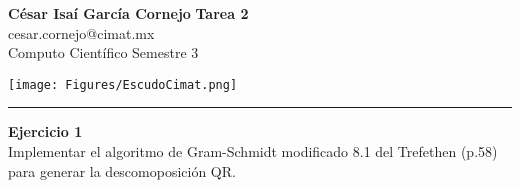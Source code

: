 \documentclass[a4paper, 11pt]{article}
\newenvironment{problem}[2][Ejercicio]
{ \begin{mdframed}[backgroundcolor= red!50] \textbf{#1 #2} \\}
	{  \end{mdframed}}
\begin{document}
	\noindent
	
	\begin{minipage}[b][1.2cm][t]{0.8\textwidth}
		\large\textbf{César Isaí García Cornejo} \hfill \textbf{Tarea 2}  \\
		cesar.cornejo@cimat.mx \hfill \\
		\normalsize Computo Científico \hfill Semestre 3\\
	\end{minipage}
	
	\hspace{14.4cm}
	\begin{minipage}[b][0.03cm][t]{0.12\linewidth}
		
		\vspace{-2.2cm}
		\texttt{[image: Figures/EscudoCimat.png]}
	\end{minipage}
	
	\noindent\rule{7in}{2.8pt}
	
	\setlength{\parskip}{\medskipamount}
	\setlength{\parindent}{0pt}
\begin{problem}{1}
    Implementar el algoritmo de Gram-Schmidt modificado 8.1 del Trefethen (p.58) para generar la descomoposición QR.
\end{problem}
\end{document}
